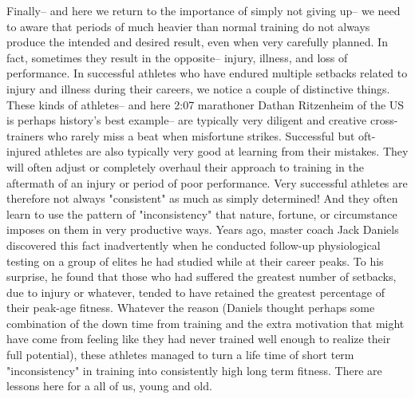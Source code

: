 Finally-- and here we return to the importance of simply not giving up-- we need to aware that periods of much heavier than normal training do not always produce the intended and desired result, even when very carefully planned. In fact, sometimes they result in the opposite-- injury, illness, and loss of performance. In successful athletes who have endured multiple setbacks related to injury and illness during their careers, we notice a couple of distinctive things. These kinds of athletes-- and here 2:07 marathoner Dathan Ritzenheim of the US is perhaps history's best example-- are typically very diligent and creative cross-trainers who rarely miss a beat when misfortune strikes. Successful but oft-injured athletes are also typically very good at learning from their mistakes. They will often adjust or completely overhaul their approach to training in the aftermath of an injury or period of poor performance. Very successful athletes are therefore not always "consistent" as much as simply determined! And they often learn to use the pattern of "inconsistency" that nature, fortune, or circumstance imposes on them in very productive ways. Years ago, master coach Jack Daniels discovered this fact inadvertently when he conducted follow-up physiological testing on a group of elites he had studied while at their career peaks. To his surprise, he found that those who had suffered the greatest number of setbacks, due to injury or whatever, tended to have retained the greatest percentage of their peak-age fitness. Whatever the reason (Daniels thought perhaps some combination of the down time from training and the extra motivation that might have come from feeling like they had never trained well enough to realize their full potential), these athletes managed to turn a life time of short term "inconsistency" in training into consistently high long term fitness. There are lessons here for a all of us, young and old.

